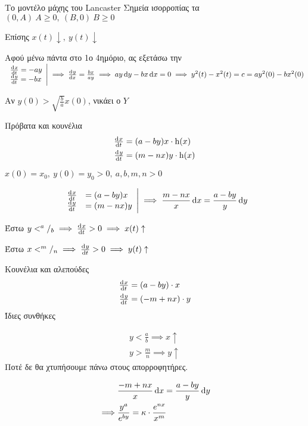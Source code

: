 \documentclass[11pt,a4paper,titlepage,final]{article}
\begin{document}
\begin{exercise*}{Το μοντέλο μάχης του \textlatin{Lancaster}}
Σημεία ισορροπίας τα \( (0,A)\ A \geq 0,\ (B,0)\ B \geq 0 \)

Επίσης \( x(t) \downarrow,\ y(t) \downarrow \)

Αφού μένω πάντα στο 1ο 4ημόριο, ας εξετάσω την
\(  \left.
\begin{array}{l}
\od{x}{t}=-ay \\ \od{y}{t} = -bx
\end{array} \right| \implies \od{y}{x}=\frac{bx}{ay} \\ \implies ay\dif y -bx\dif x = 0 \implies
y^2(t)-x^2(t)=c=ay^2(0)-bx^2(0)
 \)

 Αν \( y(0) > \sqrt{\frac{b}{a}} x(0) \), νικάει ο \( Y \)


\end{exercise*}

\begin{exercise*}{Πρόβατα και κουνέλια}
\begin{align*}
\od{x}{t} &= (a-by)x \cdot \mathrm h(x) \\
\od{y}{t} &= (m-nx)y \cdot \mathrm h(x)
\end{align*}

\( x(0) = x_0, \ y(0) = y_0 >0,\ a,b,m,n>0 \)
\tcblower

\[
\left.
\begin{array}{ll}
\od{x}{t} &= (a-by)x \\ \od{y}{t} &= (m-nx)y
\end{array}
\right| \implies \frac{m-nx}{x} \dif x = \frac{a-by}{y} \dif y
\]

Έστω \( y < ^a/_b \implies \od{x}{t} > 0 \implies x(t) \uparrow \)

Έστω \( x < ^m/_n \implies \od{y}{t} > 0 \implies y(t) \uparrow \)


\end{exercise*}


\begin{exercise*}{Κουνέλια και αλεπούδες}
\begin{align*}
\od{x}{t} &= (a-by)\cdot x \\
\od{y}{t} &= (-m+nx)\cdot y
\end{align*}
Ίδιες συνθήκες
\tcblower

\begin{align*}
y < \frac{a}{b} \implies x \uparrow \\
y > \frac{m}{n} \implies y \uparrow
\end{align*}
Ποτέ δε θα χτυπήσουμε πάνω στους απορροφητήρες.

\begin{align*}
& \frac{-m+nx}{x}\dif x = \frac{a-by}{y}\dif y \\
\implies & \frac{y^a}{e^{by}} = \kappa \cdot \frac{e^{nx}}{x^m}
\end{align*}
\end{exercise*}
\end{document}
